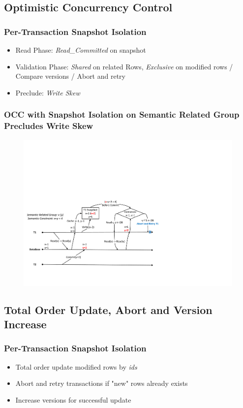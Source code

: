 \documentclass{beamer}
\begin{document}
\subsection{Optimistic Concurrency Control}
\begin{frame}
	\frametitle{Per-Transaction Snapshot Isolation}
	\begin{itemize}
		\item Read Phase: \textit{Read\_Committed} on snapshot
		\item Validation Phase: \textit{Shared} on related Rows, \textit{Exclusive} on modified rows / Compare versions / Abort and retry
		\item Preclude: \textit{Write Skew}
	\end{itemize}
\end{frame}
\begin{frame}
	\frametitle{OCC with Snapshot Isolation on Semantic Related Group Precludes Write Skew}
	\begin{figure}[h]
		\centering
		\includegraphics[width=\linewidth]{figs/snapwriteskew.pdf}
	\end{figure}
\end{frame}

\subsection{Total Order Update, Abort and Version Increase}
\begin{frame}
	\frametitle{Per-Transaction Snapshot Isolation}
	\begin{itemize}
		\item Total order update modified rows by \textit{ids}
		\item Abort and retry transactions if "new" rows already exists
		\item Increase versions for successful update
	\end{itemize}
\end{frame}
\end{document}
